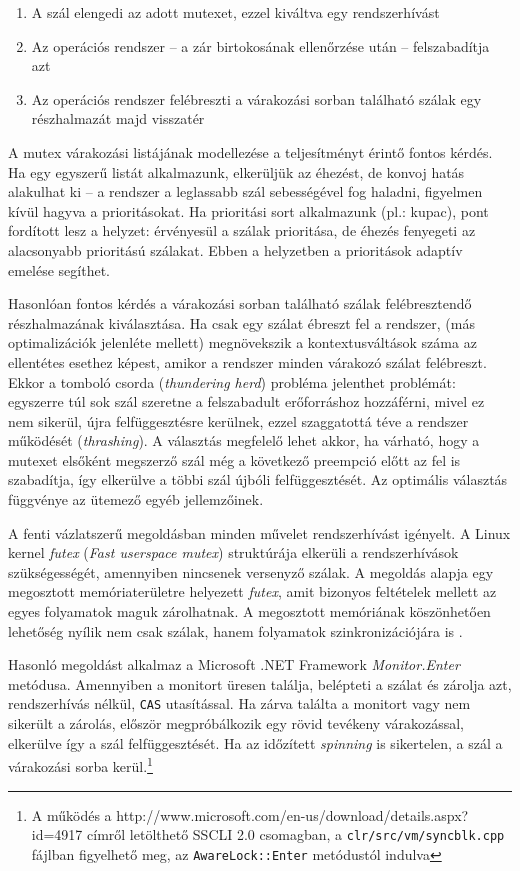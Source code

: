     \begin{enumerate}
        \item A szál elengedi az adott mutexet, ezzel kiváltva egy rendszerhívást
        \item Az operációs rendszer -- a zár birtokosának ellenőrzése után -- felszabadítja azt
        \item Az operációs rendszer felébreszti a várakozási sorban található szálak egy részhalmazát majd visszatér
    \end{enumerate}
%
    A mutex várakozási listájának modellezése a teljesítményt érintő fontos kérdés. Ha egy egyszerű listát alkalmazunk, elkerüljük az éhezést, de konvoj hatás alakulhat ki -- a rendszer a leglassabb szál sebességével fog haladni, figyelmen kívül hagyva a prioritásokat. Ha prioritási sort alkalmazunk (pl.: kupac), pont fordított lesz a helyzet: érvényesül a szálak prioritása, de éhezés fenyegeti az alacsonyabb prioritású szálakat. Ebben a helyzetben a prioritások adaptív emelése segíthet.
    
    Hasonlóan fontos kérdés a várakozási sorban található szálak felébresztendő részhalmazának kiválasztása. Ha csak egy szálat ébreszt fel a rendszer, (más optimalizációk jelenléte mellett) megnövekszik a kontextusváltások száma az ellentétes esethez képest, amikor a rendszer minden várakozó szálat felébreszt. Ekkor a tomboló csorda (\emph{thundering herd}) probléma jelenthet problémát: egyszerre túl sok szál szeretne a felszabadult erőforráshoz hozzáférni, mivel ez nem sikerül, újra felfüggesztésre kerülnek, ezzel szaggatottá téve a rendszer működését (\emph{thrashing}). A választás megfelelő lehet akkor, ha várható, hogy a mutexet elsőként megszerző szál még a következő preempció előtt az fel is szabadítja, így elkerülve a többi szál újbóli felfüggesztését. Az optimális választás függvénye az ütemező egyéb jellemzőinek.
    
    A fenti vázlatszerű megoldásban minden művelet rendszerhívást igényelt. A Linux kernel \emph{futex} (\emph{Fast userspace mutex}) struktúrája elkerüli a rendszerhívások szükségességét, amennyiben nincsenek versenyző szálak. A megoldás alapja egy megosztott memóriaterületre helyezett \emph{futex}, amit bizonyos feltételek mellett az egyes folyamatok maguk zárolhatnak. A megosztott memóriának köszönhetően lehetőség nyílik nem csak szálak, hanem folyamatok szinkronizációjára is \cite{Futex}.
    
    Hasonló megoldást alkalmaz a Microsoft .NET Framework \emph{Monitor.Enter} metódusa. Amennyiben a monitort üresen találja, belépteti a szálat és zárolja azt, rendszerhívás nélkül, \texttt{CAS} utasítással. Ha zárva találta a monitort vagy nem sikerült a zárolás, először megpróbálkozik egy rövid tevékeny várakozással, elkerülve így a szál felfüggesztését. Ha az időzített \emph{spinning} is sikertelen, a szál a várakozási sorba kerül.\footnote{A működés a http://www.microsoft.com/en-us/download/details.aspx?id=4917 címről letölthető SSCLI 2.0 csomagban, a \texttt{clr/src/vm/syncblk.cpp} fájlban figyelhető meg, az \texttt{AwareLock::Enter} metódustól indulva}
        
